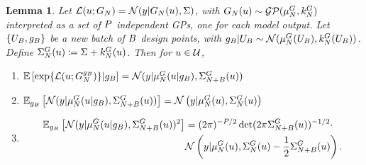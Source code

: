 \documentclass[12pt]{article}
\newtheorem{lemma}{Lemma}
\begin{document}
\begin{lemma} \label{lemma:fwd-Gaussian-density-dist}
Let $\llik(\Par; \fwdEm) = \Gaussian(\obs | \fwdEm(\Par), \likPar)$, with 
$\fwdEm(\Par) \sim \GP(\emMean[\Ndesign]{\fwd}, \emKer[\Ndesign]{\fwd})$ interpreted as a set of $\dimObs$ independent 
GPs, one for each model output. Let $\{\designBatchIn, \designBatchFwd\}$ be a new batch of $\Nbatch$ 
design points, with
$\designBatchFwd | \designBatchIn \sim \Gaussian(\emMean[\Ndesign]{\fwd}(\designBatchIn), \emKer[\Ndesign]{\fwd}(\designBatchIn))$. 
Define $\CovComb[\Ndesign](\Par) \Def \likPar + \emKer[\Ndesign]{\fwd}(\Par)$. 
Then for $\Par \in \parSpace$,
\begin{enumerate}
\item $\E \left[\Exp{\llik(\Par; \fwdEmCond{\designBatchFwd})} | \designBatchFwd \right] 
= \Gaussian(\obs | \emMean[\Ndesign]{\fwd}(\Par | \designBatchFwd), \CovComb[\Naugment](\Par))$
\item $\E_{\designBatchFwd} \left[\Gaussian(\obs | \emMean[\Ndesign]{\fwd}(\Par | \designBatchFwd), \CovComb[\Naugment](\Par))\right]
= \Gaussian\left(\obs | \emMean[\Ndesign]{\fwd}(\Par), \CovComb[\Ndesign](\Par)\right)$
\item 
\begin{align*}
\E_{\designBatchFwd} \left[\Gaussian(\obs | \emMean[\Ndesign]{\fwd}(\Par| \designBatchFwd), \CovComb[\Naugment](\Par))^2\right] &= 
(2\pi)^{-\dimObs/2} \det(2\pi \CovComb[\Naugment](\Par))^{-1/2} \cdot \\
&\Gaussian\left(\obs | \emMean[\Ndesign]{\fwd}(\Par), \CovComb[\Ndesign](\Par) - \frac{1}{2} \CovComb[\Naugment](\Par) \right). 
\end{align*}
\end{enumerate}
\end{lemma}
\end{document}
